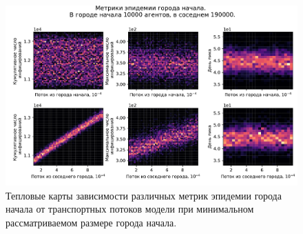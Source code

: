 \documentclass[a4paper,12pt]{article} %
\begin{document}

\begin{figure}[H]
    \centering
    \includegraphics[width=0.9\linewidth]{images/bignsmall_10000_0.pdf}
    \caption{Тепловые карты зависимости различных метрик эпидемии города начала от транспортных потоков модели при минимальном рассматриваемом размере города начала.}
    \label{pic:bignsmall_10000_0}
\end{figure}
\end{document}
